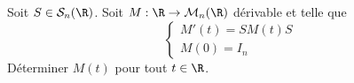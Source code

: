\begin{exo}
    \label{edo1}
    Soit $S\in\mathcal S_n(\R)$.
    Soit $M:\R\to\mathcal M_n(\R)$ dérivable et telle que 
    \[
        \left\lbrace \begin{array}{c} M'(t)=SM(t)S\\ M(0) = I_n\end{array}\right.    
    \]
    Déterminer $M(t)$ pour tout $t\in\R$.
\end{exo}